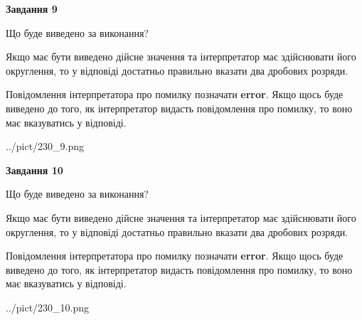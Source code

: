 \documentclass[12pt, ukrainian]{article}
\begin{document}
{\begin {Large}
{\begin {center}\textbf{Завдання 9}\end {center}}\par
Що буде виведено за виконання? \par

Якщо має бути виведено дійсне значення та інтерпретатор має здійснювати його округлення, 
то у відповіді достатньо правильно вказати два дробових розряди.

Повідомлення інтерпретатора про помилку позначати \textbf{error}.
Якщо щось буде виведено до того, як інтерпретатор видасть повідомлення про помилку, 
то воно має вказуватись у відповіді. \par

\begin{center}
	{../pict/230_9.png}
\end{center}
\newpage

{\begin {center}\textbf{Завдання 10}\end {center}}\par
Що буде виведено за виконання? \par

Якщо має бути виведено дійсне значення та інтерпретатор має здійснювати його округлення, 
то у відповіді достатньо правильно вказати два дробових розряди.

Повідомлення інтерпретатора про помилку позначати \textbf{error}.
Якщо щось буде виведено до того, як інтерпретатор видасть повідомлення про помилку, 
то воно має вказуватись у відповіді. \par

\begin{center}
	{../pict/230_10.png}
\end{center}
\newpage

\end {Large}}
\end{document}
